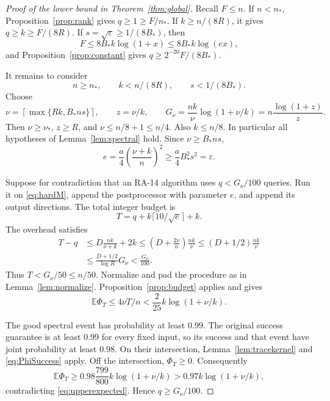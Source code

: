 \documentclass[11pt]{article}
\numberwithin{equation}{section}
\theoremstyle{remark}\newtheorem{remark}[theorem]{Remark}
\newcommand{\E}{\mathbb E}
\newcommand{\eps}{\varepsilon}
\begin{document}
\begin{proof}[Proof of the lower bound in Theorem~\ref{thm:global}]
Recall $F\le n$. If $n<n_*$, Proposition~\ref{prop:rank} gives $q\ge1\ge F/n_*$. If $k\ge n/(8R)$, it gives $q\ge k\ge F/(8R)$. If $s=\sqrt\eps\ge1/(8B_*)$, then
\[
F\le8B_*k\log(1+x)\le8B_*k\log(ex),
\]
and Proposition~\ref{prop:constant} gives $q\ge 2^{-20}F/(8B_*)$.

It remains to consider
\begin{equation}\label{eq:hardregime}
n\ge n_*,\qquad k<n/(8R),\qquad s<1/(8B_*).
\end{equation}
Choose
\begin{equation}\label{eq:nuchoice}
\nu=\left\lceil\max\{Rk,B_*ns\}\right\rceil,
\qquad z=\nu/k,
\qquad G_\nu=\frac{nk}{\nu}\log(1+\nu/k)=n\frac{\log(1+z)}{z}.
\end{equation}
Then $\nu\ge\nu_*$, $z\ge R$, and $\nu\le n/8+1\le n/4$. Also $k\le n/8$. In particular all hypotheses of Lemma~\ref{lem:spectral} hold. Since $\nu\ge B_*ns$,
\[
e=\frac a4\left(\frac{\nu+k}{n}\right)^2\ge\frac a4B_*^2s^2=\eps.
\]

Suppose for contradiction that an RA-14 algorithm uses $q<G_\nu/100$ queries. Run it on \eqref{eq:hardM}, append the postprocessor with parameter $e$, and append its output directions. The total integer budget is
\[
T=q+k\lceil10/\sqrt e\rceil+k.
\]
The overhead satisfies
\begin{align*}
T-q&\le D\frac{nk}{\nu+k}+2k
\le\left(D+\frac{2\nu}{n}\right)\frac{nk}{\nu}
\le(D+1/2)\frac{nk}{\nu}\\
&\le\frac{D+1/2}{\log R}G_\nu<\frac{G_\nu}{100}.
\end{align*}
Thus $T<G_\nu/50\le n/50$. Normalize and pad the procedure as in Lemma~\ref{lem:normalize}. Proposition~\ref{prop:budget} applies and gives
\begin{equation}\label{eq:upperexpected}
\E\Phi_T\le4\nu T/n<\frac{2}{25}k\log(1+\nu/k).
\end{equation}

The good spectral event has probability at least $0.99$. The original success guarantee is at least $0.99$ for every fixed input, so its success and that event have joint probability at least $0.98$. On their intersection, Lemma~\ref{lem:tracekernel} and \eqref{eq:PhiSuccess} apply. Off the intersection, $\Phi_T\ge0$. Consequently
\begin{equation}\label{eq:lowerexpected}
\E\Phi_T\ge0.98\frac{799}{800}k\log(1+\nu/k)
>0.97k\log(1+\nu/k),
\end{equation}
contradicting \eqref{eq:upperexpected}. Hence $q\ge G_\nu/100$.


\end{proof}
\end{document}
